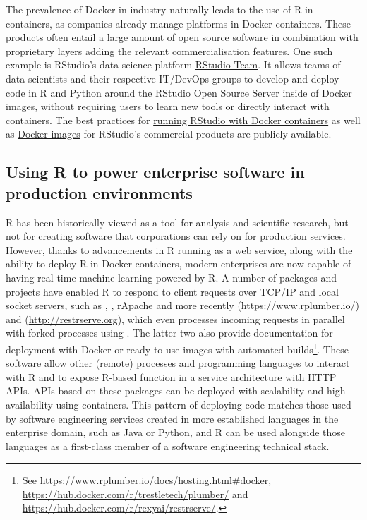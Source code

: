 The prevalence of Docker in industry naturally leads to the use of R in
containers, as companies already manage platforms in Docker containers.
These products often entail a large amount of open source software in
combination with proprietary layers adding the relevant
commercialisation features. One such example is RStudio's data science
platform \href{https://rstudio.com/products/team/}{RStudio Team}. It
allows teams of data scientists and their respective IT/DevOps groups to
develop and deploy code in R and Python around the RStudio Open Source
Server inside of Docker images, without requiring users to learn new
tools or directly interact with containers. The best practices for
\href{https://support.rstudio.com/hc/en-us/articles/360021594513-Running-RStudio-with-Docker-containers}{running
RStudio with Docker containers} as well as
\href{https://github.com/rstudio/rstudio-docker-products}{Docker images}
for RStudio's commercial products are publicly available.

\hypertarget{using-r-to-power-enterprise-software-in-production-environments}{%
\subsection{Using R to power enterprise software in production
environments}\label{using-r-to-power-enterprise-software-in-production-environments}}

\label{enterprise}

R has been historically viewed as a tool for analysis and scientific
research, but not for creating software that corporations can rely on
for production services. However, thanks to advancements in R running as
a web service, along with the ability to deploy R in Docker containers,
modern enterprises are now capable of having real-time machine learning
powered by R. A number of packages and projects have enabled R to
respond to client requests over TCP/IP and local socket servers, such as
 \citep{cran_rserve}, 
\citep{grosjean_sciviews_2019}, \href{http://www.rapache.net}{rApache}
and more recently  (\url{https://www.rplumber.io/}) and
 (\url{http://restrserve.org}), which even processes
incoming requests in parallel with forked processes using
. The latter two also provide documentation for
deployment with Docker or ready-to-use images with automated
builds\footnote{See \href{https://www.rplumber.io/docs/hosting.html\#docker}{https://www.rplumber.io/docs/hosting.html\#docker}, \href{https://hub.docker.com/r/trestletech/plumber/}{https://hub.docker.com/r/trestletech/plumber/} and \href{https://hub.docker.com/r/rexyai/restrserve/}{https://hub.docker.com/r/rexyai/restrserve/}.}.
These software allow other (remote) processes and programming languages
to interact with R and to expose R-based function in a service
architecture with HTTP APIs. APIs based on these packages can be
deployed with scalability and high availability using containers. This
pattern of deploying code matches those used by software engineering
services created in more established languages in the enterprise domain,
such as Java or Python, and R can be used alongside those languages as a
first-class member of a software engineering technical stack.

